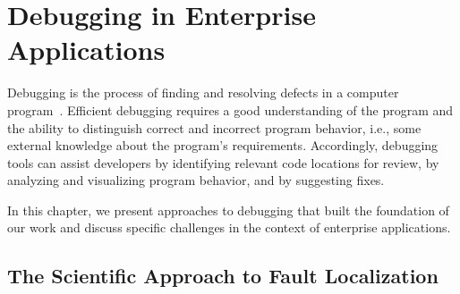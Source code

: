 %
%



\chapter{Debugging in Enterprise Applications}
\label{sec:debugging_in_ea}

Debugging is the process of finding and resolving defects in a computer program~\cite{araki91:a_general_framework}.
Efficient debugging requires a good understanding of the program and the ability to distinguish correct and incorrect program behavior, i.e., some external knowledge about the program's requirements.
Accordingly, debugging tools can assist developers by identifying relevant code locations for review, by analyzing and visualizing program behavior, and by suggesting fixes.

In this chapter, we present approaches to debugging that built the foundation of our work and discuss specific challenges in the context of enterprise applications.

\section{The Scientific Approach to Fault Localization}

